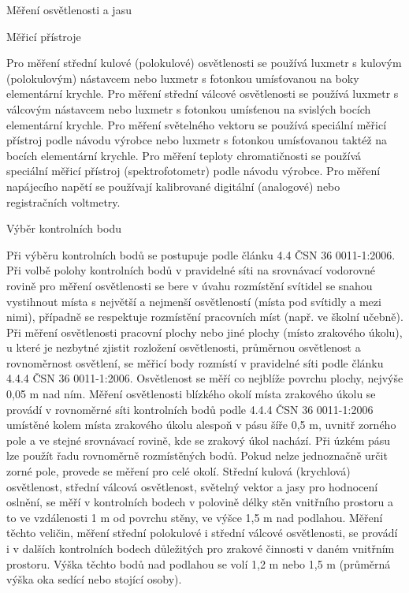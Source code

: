 \chap Měření osvětlenosti a jasu

\sec Měřicí přístroje

Pro měření střední kulové (polokulové) osvětlenosti se používá luxmetr s kulovým (polokulovým) nástavcem nebo luxmetr s fotonkou umísťovanou na boky elementární krychle. Pro měření střední válcové osvětlenosti se používá luxmetr s válcovým nástavcem nebo luxmetr s fotonkou umísťenou na svislých bocích elementární krychle. Pro měření světelného vektoru se používá speciální měřicí přístroj podle návodu výrobce nebo luxmetr s fotonkou umísťovanou taktéž na bocích elementární krychle. Pro měření teploty chromatičnosti se používá speciální měřicí přístroj (spektrofotometr) podle návodu výrobce. Pro měření napájecího napětí se používají kalibrované digitální (analogové) nebo registračních voltmetry.

\sec Výběr kontrolních bodu

Při výběru kontrolních bodů se postupuje podle článku 4.4 ČSN 36 0011-1:2006. Při volbě polohy kontrolních bodů v pravidelné síti na srovnávací vodorovné rovině pro měření osvětlenosti se bere v úvahu rozmístění svítidel se snahou vystihnout místa s největší a nejmenší osvětleností (místa pod svítidly a mezi nimi), případně se respektuje rozmístění pracovních míst (např. ve školní učebně).
\medskip
Při měření osvětlenosti pracovní plochy nebo jiné plochy (místo zrakového úkolu), u které je nezbytné zjistit rozložení osvětlenosti, průměrnou osvětlenost a rovnoměrnost osvětlení, se měřicí body rozmístí v pravidelné síti podle článku 4.4.4 ČSN 36 0011-1:2006. Osvětlenost se měří co nejblíže povrchu plochy, nejvýše 0,05 m nad ním.
\medskip
Měření osvětlenosti blízkého okolí místa zrakového úkolu se provádí v rovnoměrné síti kontrolních bodů podle 4.4.4 ČSN 36 0011-1:2006 umístěné kolem místa zrakového úkolu alespoň v pásu šíře 0,5 m, uvnitř zorného pole a ve stejné srovnávací rovině, kde se zrakový úkol nachází. Při úzkém pásu lze použít řadu rovnoměrně rozmístěných bodů. Pokud nelze jednoznačně určit zorné pole, provede se měření pro celé okolí.
Střední kulová (krychlová) osvětlenost, střední válcová osvětlenost, světelný vektor a jasy pro hodnocení oslnění, se měří v kontrolních bodech v polovině délky stěn vnitřního prostoru a to ve vzdálenosti 1 m od povrchu stěny, ve výšce 1,5 m nad podlahou.
\medskip
Měření těchto veličin, měření střední polokulové i střední válcové osvětlenosti, se provádí i v dalších kontrolních bodech důležitých pro zrakové činnosti v daném vnitřním prostoru. Výška těchto bodů nad podlahou se volí 1,2 m nebo 1,5 m (průměrná výška oka sedící nebo stojící osoby).

